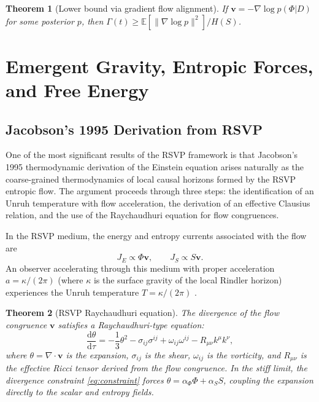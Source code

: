 \documentclass[12pt, a4paper]{article}
\theoremstyle{plain}
\newtheorem{theorem}{Theorem}[section]
\theoremstyle{definition}
\theoremstyle{remark}
\newcommand{\vfield}{\mathbf{v}}
\newcommand{\divv}{\nabla\!\cdot\!\vfield}
\begin{document}
\begin{theorem}[Lower bound via gradient flow alignment]
If $\vfield = -\nabla\log p(\Phi|D)$ for some posterior $p$, then
$\Gamma(t) \geq \mathbb{E}[\|\nabla\log p\|^2]/H(S)$.
\end{theorem}

\section{Emergent Gravity, Entropic Forces, and Free Energy}
\label{sec:emergent}

\subsection{Jacobson's 1995 Derivation from RSVP}

One of the most significant results of the RSVP framework is that Jacobson's 1995
thermodynamic derivation of the Einstein equation \cite{Jacobson1995} arises naturally
as the coarse-grained thermodynamics of local causal horizons formed by the RSVP
entropic flow.  The argument proceeds through three steps: the identification of an
Unruh temperature with flow acceleration, the derivation of an effective Clausius relation,
and the use of the Raychaudhuri equation for flow congruences.

In the RSVP medium, the energy and entropy currents associated with the flow are
\[
J_E \propto \Phi\vfield,
\qquad
J_S \propto S\vfield.
\]
An observer accelerating through this medium with proper acceleration $a = \kappa/(2\pi)$
(where $\kappa$ is the surface gravity of the local Rindler horizon) experiences the
Unruh temperature $T = \kappa/(2\pi)$ \cite{Unruh1976}.

\begin{theorem}[RSVP Raychaudhuri equation]
\label{thm:raychaudhuri}
The divergence of the flow congruence $\vfield$ satisfies a Raychaudhuri-type equation:
\[
\frac{\mathrm{d}\theta}{\mathrm{d}\tau} = -\frac{1}{3}\theta^2 - \sigma_{ij}\sigma^{ij}
+ \omega_{ij}\omega^{ij} - R_{\mu\nu}k^\mu k^\nu,
\]
where $\theta = \divv$ is the expansion, $\sigma_{ij}$ is the shear, $\omega_{ij}$ is
the vorticity, and $R_{\mu\nu}$ is the effective Ricci tensor derived from the flow
congruence.  In the stiff limit, the divergence constraint \eqref{eq:constraint} forces
$\theta = \alpha_\Phi\Phi + \alpha_S S$, coupling the expansion directly to the scalar
and entropy fields.
\end{theorem}
\end{document}
